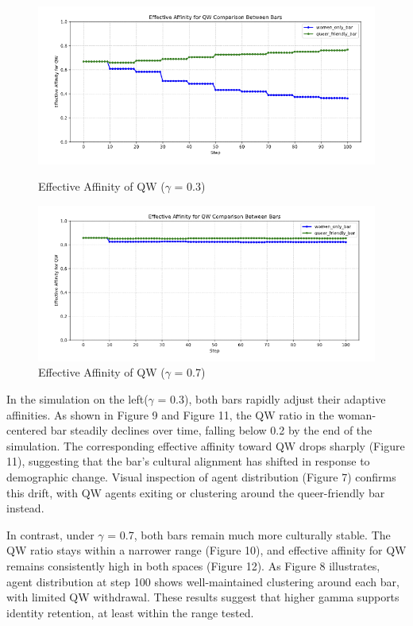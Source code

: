 \documentclass{article}
\begin{document}
\begin{figure}[H]
\centering
\begin{minipage}{0.48\textwidth}
  \centering
  \includegraphics[width=\linewidth]{figures/0.3 ea.png}
  \caption{Effective Affinity of QW ($\gamma$ = 0.3)}
\end{minipage}
\hfill
\begin{minipage}{0.48\textwidth}
  \centering
  \includegraphics[width=\linewidth]{figures/0.7 ea.png}
  \caption{Effective Affinity of QW ($\gamma$ = 0.7)}
\end{minipage}
\end{figure}

In the simulation on the left($\gamma$ = 0.3), both bars rapidly adjust their adaptive affinities. As shown in Figure 9 and Figure 11, the QW ratio in the woman-centered bar steadily declines over time, falling below 0.2 by the end of the simulation. The corresponding effective affinity toward QW drops sharply (Figure 11), suggesting that the bar's cultural alignment has shifted in response to demographic change. Visual inspection of agent distribution (Figure 7) confirms this drift, with QW agents exiting or clustering around the queer-friendly bar instead.

In contrast, under $\gamma$ = 0.7, both bars remain much more culturally stable. The QW ratio stays within a narrower range (Figure 10), and effective affinity for QW remains consistently high in both spaces (Figure 12). As Figure 8 illustrates, agent distribution at step 100 shows well-maintained clustering around each bar, with limited QW withdrawal. These results suggest that higher gamma supports identity retention, at least within the range tested.
\end{document}
